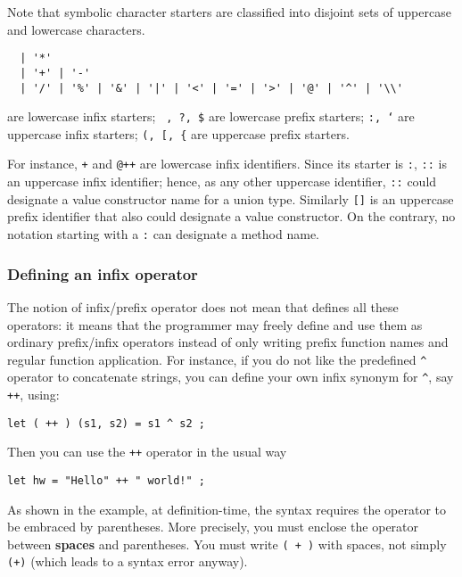 Note that symbolic character starters are classified into disjoint sets of uppercase
and lowercase characters.
\begin{verbatim}
  | '*'
  | '+' | '-'
  | '/' | '%' | '&' | '|' | '<' | '=' | '>' | '@' | '^' | '\\'
\end{verbatim}
are lowercase infix starters;
{\tt ~, ?, \$}
are lowercase prefix starters;
{\tt :, `}
are uppercase infix starters;
{\tt (, [, \{}
are uppercase prefix starters.

For instance, {\tt +} and {\tt @++} are lowercase infix identifiers.
Since its starter is {\tt :}, {\tt ::} is an uppercase infix identifier; hence,
as any other uppercase identifier, {\tt ::} could designate a
value constructor name for a union type. Similarly {\tt []} is an uppercase prefix identifier that also
could designate a value constructor.
On the contrary, no notation starting with a {\tt :} can designate a method name.

\subsubsection{Defining an infix operator}

The notion of infix/prefix operator does not mean that {\focal} defines all
these operators: it means that the programmer may freely define and use them
as ordinary prefix/infix operators instead of only writing prefix function
names and regular function application. For instance, if you do not like the
{\focal} predefined \verb"^" operator to concatenate strings, you can define your
own infix synonym for \verb"^", say {\tt ++}, using:

{\scriptsize
\begin{lstlisting}
let ( ++ ) (s1, s2) = s1 ^ s2 ;
\end{lstlisting}
}
Then you can use the {\tt ++} operator in the usual way

{\scriptsize
\begin{lstlisting}
let hw = "Hello" ++ " world!" ;
\end{lstlisting}
}

As shown in the example, at definition-time, the syntax requires
the operator to be embraced by parentheses. More precisely, you must
enclose the operator between {\bf spaces} and parentheses.
You must write {\tt ( + )} with spaces, not simply {\tt (+)} (which leads
to a syntax error anyway).

